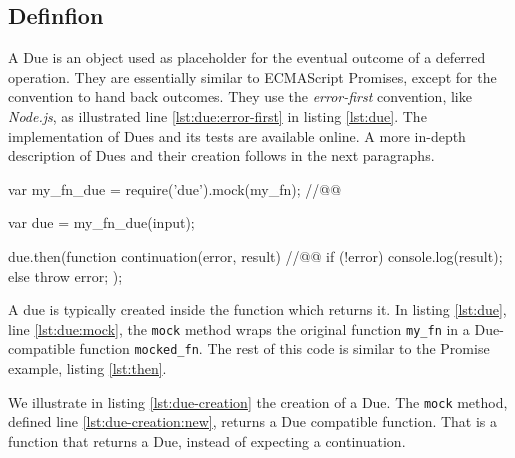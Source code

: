 \subsection{Definfion} \label{chapter5:due:definition}


A Due is an object used as placeholder for the eventual outcome of a deferred operation.
They are essentially similar to ECMAScript Promises, except for the convention to hand back outcomes.
They use the \textit{error-first} convention, like \textit{Node.js}, as illustrated line \ref{lst:due:error-first} in listing \ref{lst:due}.
The implementation of Dues and its tests are available online.
A more in-depth description of Dues and their creation follows in the next paragraphs.

\begin{code}[js, %
             caption={Example of a due}, %
             label={lst:due}] %
var my_fn_due = require('due').mock(my_fn); //@\label{lst:due:mock}@

var due = my_fn_due(input);

due.then(function continuation(error, result) { //@\label{lst:due:error-first}@
  if (!error) {
    console.log(result);
  } else {
    throw error;
  }
});
\end{code}

A due is typically created inside the function which returns it.
In listing \ref{lst:due}, line \ref{lst:due:mock}, the \texttt{mock} method wraps the original function \texttt{my\_fn} in a Due-compatible function \texttt{mocked\_fn}.
The rest of this code is similar to the Promise example, listing \ref{lst:then}.

We illustrate in listing \ref{lst:due-creation} the creation of a Due.
The \texttt{mock} method, defined line \ref{lst:due-creation:new}, returns a Due compatible function.
That is a function that returns a Due, instead of expecting a continuation.

